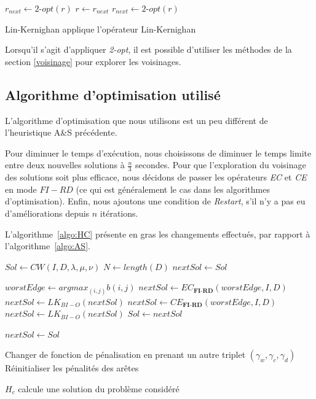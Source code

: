 \documentclass[a4paper,11pt]{article}%
\begin{document}
\begin{algorithm}
\DontPrintSemicolon %
$r_{next} \gets 2$-$opt(r) $\;
 {
  $r \gets r_{next}$\;
  $r_{next} \gets 2$-$opt(r)$\;
}
\;
\caption{{\sc Lin-Kernighan} applique l'opérateur Lin-Kernighan}
\label{algo:LK}
\end{algorithm}

Lorsqu'il s'agit d'appliquer \emph{2-opt}, il est possible d'utiliser les méthodes de la section \ref{voisinage} pour explorer les voisinages.

\subsection{Algorithme d'optimisation utilisé}
L'algorithme d'optimisation que nous utilisons est un peu différent de l'heuristique A\&S précédente.

Pour diminuer le temps d'exécution, nous choisissons de diminuer le temps limite entre deux nouvelles solutions à $\frac{n}{3}$ secondes. 
Pour que l'exploration du voisinage des solutions soit plus efficace, nous décidons de passer les opérateurs \emph{EC} et \emph{CE} en mode $FI-RD$ (ce qui est généralement le cas dans les algorithmes d'optimisation).
Enfin, nous ajoutons une condition de \emph{Restart}, s'il n'y a pas eu d'améliorations depuis $n$ itérations.

L'algorithme~\ref{algo:HC} présente en gras les changements effectués, par rapport à l'algorithme~\ref{algo:AS}.

\begin{algorithm}
\DontPrintSemicolon %
$Sol \gets CW(I,D,\lambda,\mu,\nu)$\;
$N \gets length(D)$\;
$nextSol \gets Sol$\;
 {
	$worstEdge \gets argmax_{(i,j)} b(i,j) $\;
	$nextSol \gets EC_{\textbf{FI-RD}}(worstEdge,I,D)$\;
	$nextSol \gets LK_{BI-O}(nextSol)$\;
	$nextSol \gets CE_{\textbf{FI-RD}}(worstEdge,I,D)$\;
	$nextSol \gets LK_{BI-O}(nextSol)$\;
	 {
		$ Sol \gets nextSol$\;
	}
	
	 {
		$nextSol \gets Sol$\;
	
	}
	
	 {
		Changer de fonction de pénalisation en prenant un autre triplet $(\gamma_w,\gamma_c,\gamma_d)$\;
		Réinitialiser les pénalités des arêtes\;
	}
	
}
\;
\caption{{\sc $H_c$} calcule une solution du problème considéré}
\label{algo:HC}
\end{algorithm}
\end{document}
